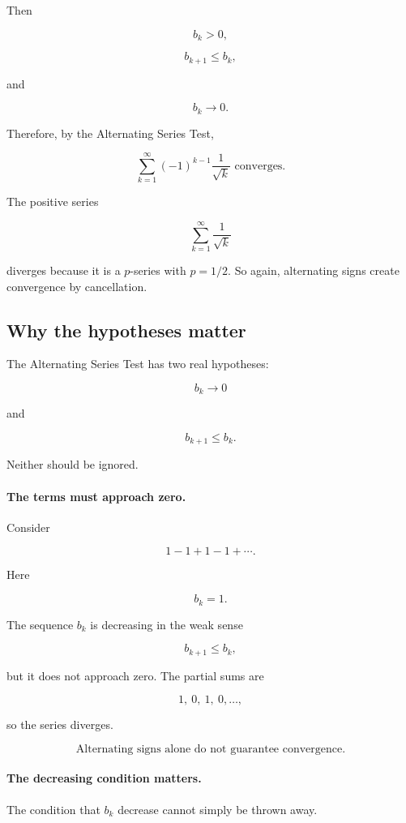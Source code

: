 Then

\[
b_k>0,
\]

\[
b_{k+1}\le b_k,
\]

and

\[
b_k\to0.
\]

Therefore, by the Alternating Series Test,

\[
\boxed{
\sum_{k=1}^{\infty}(-1)^{k-1}\frac1{\sqrt{k}}
\text{ converges.}
}
\]

The positive series

\[
\sum_{k=1}^{\infty}\frac1{\sqrt{k}}
\]

diverges because it is a \(p\)-series with \(p=1/2\).  So again, alternating signs create
convergence by cancellation.

\subsection{Why the hypotheses matter}
\label{subsec:alternating-hypotheses-matter}

The Alternating Series Test has two real hypotheses:

\[
b_k\to0
\]

and

\[
b_{k+1}\le b_k.
\]

Neither should be ignored.

\paragraph{The terms must approach zero.}
Consider

\[
1-1+1-1+\cdots.
\]

Here

\[
b_k=1.
\]

The sequence \(b_k\) is decreasing in the weak sense

\[
b_{k+1}\le b_k,
\]

but it does not approach zero.  The partial sums are

\[
1,\ 0,\ 1,\ 0,\ldots,
\]

so the series diverges.

\[
\boxed{
\text{Alternating signs alone do not guarantee convergence.}
}
\]

\paragraph{The decreasing condition matters.}
The condition that \(b_k\) decrease cannot simply be thrown away.

